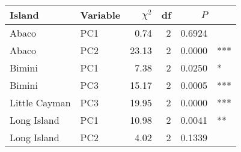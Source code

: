 
\begin{tabular}{llrrrl}
\toprule
Island & Variable & $\chi^2$ & df & $P$ & \\
\midrule
Abaco & PC1 & 0.74 & 2 & 0.6924 & \\
Abaco & PC2 & 23.13 & 2 & 0.0000 & ***\\
Bimini & PC1 & 7.38 & 2 & 0.0250 & *\\
Bimini & PC3 & 15.17 & 2 & 0.0005 & ***\\
Little Cayman & PC3 & 19.95 & 2 & 0.0000 & ***\\
Long Island & PC1 & 10.98 & 2 & 0.0041 & **\\
Long Island & PC2 & 4.02 & 2 & 0.1339 & \\
\bottomrule
\end{tabular}
